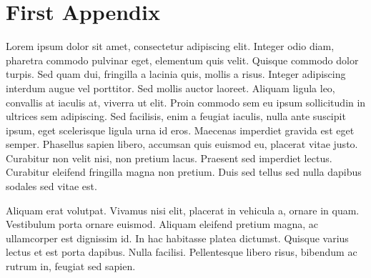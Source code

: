 \section{First Appendix}
\label{app:1}

Lorem ipsum dolor sit amet, consectetur adipiscing elit. Integer odio diam, pharetra commodo pulvinar eget, elementum quis velit. Quisque commodo dolor turpis. Sed quam dui, fringilla a lacinia quis, mollis a risus. Integer adipiscing interdum augue vel porttitor. Sed mollis auctor laoreet. Aliquam ligula leo, convallis at iaculis at, viverra ut elit. Proin commodo sem eu ipsum sollicitudin in ultrices sem adipiscing. Sed facilisis, enim a feugiat iaculis, nulla ante suscipit ipsum, eget scelerisque ligula urna id eros. Maecenas imperdiet gravida est eget semper. Phasellus sapien libero, accumsan quis euismod eu, placerat vitae justo. Curabitur non velit nisi, non pretium lacus. Praesent sed imperdiet lectus. Curabitur eleifend fringilla magna non pretium. Duis sed tellus sed nulla dapibus sodales sed vitae est.

Aliquam erat volutpat. Vivamus nisi elit, placerat in vehicula a, ornare in quam. Vestibulum porta ornare euismod. Aliquam eleifend pretium magna, ac ullamcorper est dignissim id. In hac habitasse platea dictumst. Quisque varius lectus et est porta dapibus. Nulla facilisi. Pellentesque libero risus, bibendum ac rutrum in, feugiat sed sapien.



